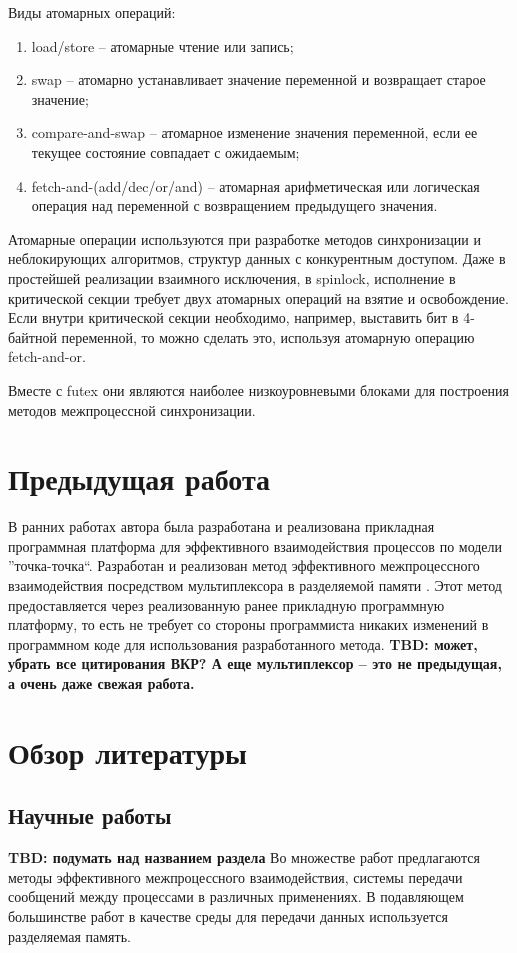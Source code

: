 Виды атомарных операций:
\begin{enumerate}
\item load/store -- атомарные чтение или запись;
\item swap -- атомарно устанавливает значение переменной и возвращает старое значение;
\item compare-and-swap -- атомарное изменение значения переменной, если ее текущее состояние совпадает с ожидаемым;
\item fetch-and-(add/dec/or/and) -- атомарная арифметическая или логическая операция над переменной с возвращением предыдущего значения.
\end{enumerate}

Атомарные операции используются при разработке методов синхронизации и неблокирующих алгоритмов, структур данных с конкурентным доступом. Даже в простейшей реализации взаимного исключения, в spinlock, исполнение в критической секции требует двух атомарных операций на взятие и освобождение. Если внутри критической секции необходимо, например, выставить бит в 4-байтной переменной, то можно сделать это, используя атомарную операцию fetch-and-or. 

Вместе с futex они являются наиболее низкоуровневыми блоками для построения методов межпроцессной синхронизации.

\section{Предыдущая работа}

В ранних работах автора была разработана и реализована прикладная программная платформа для эффективного взаимодействия процессов \cite{GubarevKMU18} по модели ''точка-точка``. Разработан и реализован метод эффективного межпроцессного взаимодействия посредством мультиплексора в разделяемой памяти \cite{GubarevKMU20}. Этот метод предоставляется через реализованную ранее прикладную программную платформу, то есть не требует со стороны программиста никаких изменений в программном коде для использования разработанного метода.
\textbf{TBD: может, убрать все цитирования ВКР? А еще мультиплексор -- это не предыдущая, а очень даже свежая работа.}

\section{Обзор литературы}

\subsection{Научные работы}
\textbf{TBD: подумать над названием раздела}
Во множестве работ предлагаются методы эффективного межпроцессного взаимодействия, системы передачи сообщений между процессами в различных применениях. В подавляющем большинстве работ в качестве среды для передачи данных используется разделяемая память.

